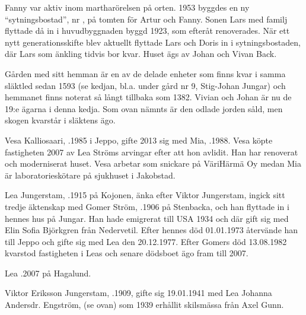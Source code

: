Fanny var aktiv inom martharörelsen på orten. 1953 byggdes en ny ``sytningsbostad'', nr , på tomten för Artur och Fanny. Sonen Lars med familj flyttade då in i huvudbyggnaden byggd 1923, som efteråt renoverades. När ett nytt generationsskifte blev aktuellt flyttade Lars och Doris in i sytningsbostaden, där Lars som änkling tidvis bor kvar. Huset ägs av Johan och Vivan Back.

Gården med sitt hemman är en av de delade enheter som finns kvar i samma släktled sedan 1593 (se kedjan, bl.a. under gård nr 9, Stig-Johan Jungar) och hemmanet finns noterat så långt tillbaka som 1382. Vivian och Johan är nu de 19:e ägarna i denna kedja. Som ovan nämnts är den odlade jorden såld, men skogen kvarstår i släktens ägo.


%



%
Vesa Kalliosaari, .1985 i Jeppo, gifte 2013 sig med Mia, .1988. Vesa köpte fastigheten 2007 av Lea Ströms arvingar efter att hon avlidit. Han har renoverat och moderniserat huset. Vesa arbetar som snickare på VäriHärmä Oy medan Mia är laboratorieskötare  på sjukhuset i Jakobstad.
\begin{jhchildren}
  \item {}
  \item {}
\end{jhchildren}


%
Lea Jungerstam, .1915 på Kojonen, änka efter Viktor Jungerstam, ingick sitt tredje äktenskap med Gomer Ström, .1906 på Stenbacka, och han flyttade in i hennes hus på Jungar. Han hade emigrerat till USA 1934 och där gift sig med Elin Sofia Björkgren från Nedervetil. Efter hennes död 01.01.1973 återvände han till Jeppo och gifte sig med Lea den 20.12.1977. Efter Gomers död 13.08.1982 kvarstod fastigheten i Leas och senare dödsboet ägo fram till 2007.

Lea .2007 på Hagalund.


%
Viktor Eriksson Jungerstam, .1909, gifte sig 19.01.1941 med Lea Johanna Andersdr. Engström,  (se ovan) som 1939 erhållit skilsmässa från Axel Gunn.

